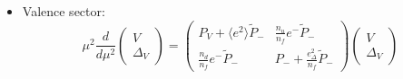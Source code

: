 \documentclass[a4paper,twoside]{article}
\begin{document}
\begin{itemize}
\item Valence sector:
\begin{equation*}
\mu^2\frac{d}{d\mu^2}
\begin{pmatrix}
V \\
\Delta_V
\end{pmatrix}
=
\begin{pmatrix}
P_V+\langle e^2\rangle \tilde{P}_{-} & \frac{n_u}{n_f}e^- \tilde{P}_{-}\\
 \frac{n_d}{n_f}e^- \tilde{P}_{-}& P_-+\frac{e_\Delta^2}{n_f} \tilde{P}_{-}
\end{pmatrix}
\begin{pmatrix}
V \\
\Delta_V
\end{pmatrix}
\end{equation*}


\end{itemize}
\end{document}
